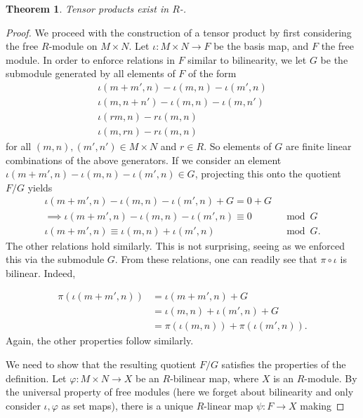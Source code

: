\documentclass[12pt]{article}
\theoremstyle{definition}
\theoremstyle{plain}
\newtheorem{theorem}{Theorem}[section]
\numberwithin{equation}{section}
\theoremstyle{definition}
\begin{document}
\begin{theorem}
Tensor products exist in $ R $-.
\end{theorem}

\begin{proof}
We proceed with the construction of a tensor product by first considering the free $ R $-module on $ M \times N $. Let $ \iota : M \times N \to F $ be the basis map, and $ F $ the free module. In order to enforce relations in $ F $ similar to bilinearity, we let $ G $ be the submodule generated by all elements of $ F $ of the form
\begin{align*}
	\iota (m + m', n) - \iota (m, n) - \iota(m', n)\\
	\iota (m, n + n') - \iota(m, n) - \iota(m, n')\\
	\iota(rm, n) - r \iota(m, n)\\
	\iota(m, rn) - r \iota(m, n)
\end{align*}
for all $ (m, n), (m', n') \in M \times N $ and $ r \in R $. So elements of $ G $ are finite linear combinations of the above generators. If we consider an element $ \iota (m + m', n) - \iota(m, n) - \iota(m', n) \in G$, projecting this onto the quotient $ F / G $ yields
\begin{align*}
	\iota (m + m', n) - \iota(m, n) - \iota(m', n) + G = 0 + G\\
	\implies  \iota (m + m', n) - \iota(m, n) - \iota(m', n) \equiv 0 &\mod G\\
	\iota(m + m', n) \equiv \iota(m, n) + \iota(m', n) &\mod G.
\end{align*}
The other relations hold similarly. This is not surprising, seeing as we enforced this via the submodule $ G $. From these relations, one can readily see that $ \pi \circ \iota $ is bilinear. Indeed,

\begin{align*}
	\pi(\iota(m + m', n)) &= \iota(m + m', n) + G\\
	&= \iota(m, n) + \iota(m', n) + G\\
	&= \pi(\iota(m, n)) + \pi(\iota(m', n)).
\end{align*}
Again, the other properties follow similarly.

We need to show that the resulting quotient $ F / G $ satisfies the properties of the definition. Let $ \varphi : M \times N \to X $ be an $ R $-bilinear map, where $ X $ is an $ R $-module. By the universal property of free modules (here we forget about bilinearity and only consider $ \iota, \varphi $ as set maps), there is a unique $ R $-linear map $ \psi : F \to X $ making 


\end{proof}
\end{document}
